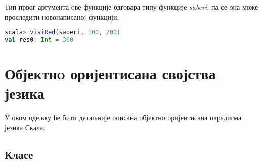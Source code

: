 \documentclass[12pt,oneside]{memoir}
\begin{document}
Тип првог аргумента ове функције одговара типу функције \textit{saberi}, па се она може проследити новонаписаној функцији.

\begin{lstlisting}[language=Scala, caption={Прослеђивање функције функцији}, label={lst:scala_function_add_high_order}, basicstyle=\small]
scala> visiRed(saberi, 100, 200)
val res0: Int = 300
\end{lstlisting}


%
%
%

\section{Објектнo оријентисана својства језика}
\label{sec:scala_oop}

У овом одељку ће бити детаљније описана објектно оријентисана парадигма језика Скала.

\subsection{Класе}
\label{subsec:scala_klase}
\end{document}
